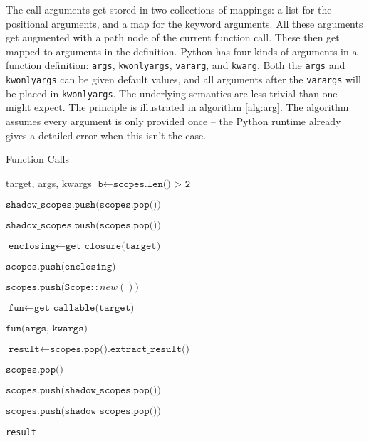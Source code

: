 \documentclass[a4paper, 16pt, oneside]{Thesis}
\begin{document}
The call arguments get stored in two collections of mappings: a list for
the positional arguments, and a map for the keyword arguments. All these
arguments get augmented with a path node of the current function call.
These then get mapped to arguments in the definition. Python has four
kinds of arguments in a function definition: \texttt{args},
\texttt{kwonlyargs}, \texttt{vararg}, and \texttt{kwarg}. Both the
\texttt{args} and \texttt{kwonlyargs} can be given default values, and
all arguments after the \texttt{varargs} will be placed in
\texttt{kwonlyargs}. The underlying semantics are less trivial than one
might expect. The principle is illustrated in algorithm \ref{alg:arg}.
The algorithm assumes every argument is only provided once -- the Python
runtime already gives a detailed error when this isn't the case.

\begin{algorithm}
    \caption{Function Calls}\label{alg:call}
    \begin{algorithmic}[1]
         {target, args, kwargs}
          \State $\texttt{b} \gets \texttt{scopes.len() > 2}$

            \State $\texttt{shadow\_scopes.push(scopes.pop())}$

            \State $\texttt{shadow\_scopes.push(scopes.pop())}$
          \EndIf

          \State

          \State $\texttt{enclosing} \gets \texttt{get\_closure(target)}$

          \State $\texttt{scopes.push(enclosing)}$

          \State $\texttt{scopes.push(Scope}::new())$

          \State

          \State $\texttt{fun} \gets \texttt{get\_callable(target)}$

          \State $\texttt{fun(args, kwargs)}$

          \State

          \State $\texttt{result} \gets \texttt{scopes.pop().extract\_result()}$

          \State $\texttt{scopes.pop()}$

            \State $\texttt{scopes.push(shadow\_scopes.pop())}$

            \State $\texttt{scopes.push(shadow\_scopes.pop())}$
          \EndIf

          \State \Return \texttt{result}

        \EndFunction
    \end{algorithmic}
\end{algorithm}
\end{document}
